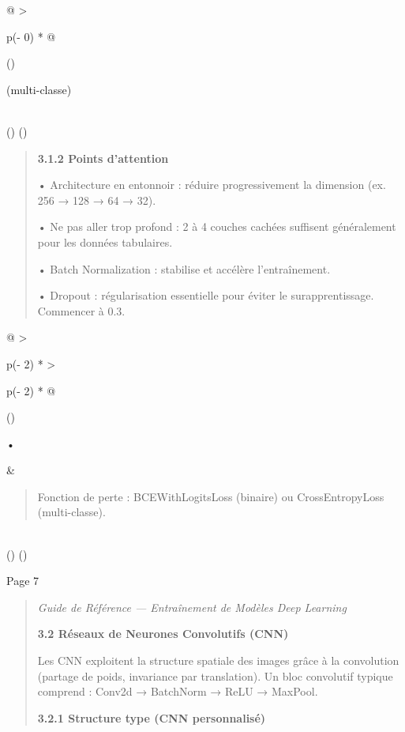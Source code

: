 \documentclass[
]{article}
\begin{document}
\begin{longtable}[]{@{}
  >{\raggedright\arraybackslash}p{(\columnwidth - 0\tabcolsep) * }@{}}
\toprule()
\begin{minipage}[b]{\linewidth}\raggedright
(multi-classe)
\end{minipage} \\
\midrule()
\endhead
\bottomrule()
\end{longtable}

\begin{quote}
\textbf{3.1.2 Points d'attention}

• Architecture en entonnoir : réduire progressivement la dimension (ex.
256 → 128 → 64 → 32).

• Ne pas aller trop profond : 2 à 4 couches cachées suffisent
généralement pour les données tabulaires.

• Batch Normalization : stabilise et accélère l'entraînement.

• Dropout : régularisation essentielle pour éviter le surapprentissage.
Commencer à 0.3.
\end{quote}

\begin{longtable}[]{@{}
  >{\raggedright\arraybackslash}p{(\columnwidth - 2\tabcolsep) * }
  >{\raggedright\arraybackslash}p{(\columnwidth - 2\tabcolsep) * }@{}}
\toprule()
\begin{minipage}[b]{\linewidth}\raggedright
•
\end{minipage} & \begin{minipage}[b]{\linewidth}\raggedright
\begin{quote}
Fonction de perte : BCEWithLogitsLoss (binaire) ou CrossEntropyLoss
(multi-classe).
\end{quote}
\end{minipage} \\
\midrule()
\endhead
\bottomrule()
\end{longtable}

Page 7

\begin{quote}
\emph{Guide de Référence --- Entraînement de Modèles Deep Learning}

\textbf{3.2 Réseaux de Neurones Convolutifs (CNN)}

Les CNN exploitent la structure spatiale des images grâce à la
convolution (partage de poids, invariance par translation). Un bloc
convolutif typique comprend : Conv2d → BatchNorm → ReLU → MaxPool.

\textbf{3.2.1 Structure type (CNN personnalisé)}
\end{quote}
\end{document}
